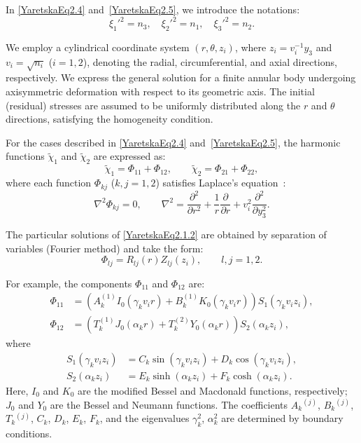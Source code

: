In \eqref{YaretskaEq2.4} and~\eqref{YaretskaEq2.5}, we introduce the notations:
\begin{equation} \label{YaretskaEq2.1.1}
	\xi_1'^2 = n_3, \quad \xi_2'^2 = n_1, \quad \xi_3'^2 = n_2.
\end{equation}

We employ a cylindrical coordinate system $(r, \theta, z_i)$, where $z_i = v_i^{-1} y_3$ and $v_i = \sqrt{n_i}$ ($i=1,2$), denoting the radial, circumferential, and axial directions, respectively. We express the general solution for a finite annular body undergoing axisymmetric deformation with respect to its geometric axis. The initial (residual) stresses are assumed to be uniformly distributed along the $r$ and $\theta$ directions, satisfying the homogeneity condition.

For the cases described in \eqref{YaretskaEq2.4} and~\eqref{YaretskaEq2.5}, the harmonic functions $\tilde{\chi}_1$ and $\tilde{\chi}_2$ are expressed as:
\begin{equation} \label{YaretskaEq2.1.2}
	\tilde{\chi}_1 = \Phi_{11} + \Phi_{12}, \qquad \tilde{\chi}_2 = \Phi_{21} + \Phi_{22},
\end{equation}
where each function $\Phi_{kj}$ ($k,j=1,2$) satisfies Laplace’s equation~\cite{YaretskaRef17}:
\begin{equation} \label{YaretskaEq2.1.3}
	\nabla^2 \Phi_{kj} = 0, \qquad \nabla^2 = \frac{\partial^2}{\partial r^2} + \frac{1}{r} \frac{\partial}{\partial r} + v_i^2 \frac{\partial^2}{\partial y_3^2}.
\end{equation}

The particular solutions of \eqref{YaretskaEq2.1.2} are obtained by separation of variables (Fourier method) and take the form:
\begin{equation} \label{YaretskaEq2.1.4}
	\Phi_{lj} = R_{lj}(r) Z_{lj}(z_i), \qquad l,j = 1,2.
\end{equation}

For example, the components $\Phi_{11}$ and $\Phi_{12}$ are:
\begin{equation} \label{YaretskaEq2.1.5}
	\begin{array}{ll}
		\Phi_{11} &= \left( A_k^{(1)} I_0(\gamma_k v_i r) + B_k^{(1)} K_0(\gamma_k v_i r) \right) S_1(\gamma_k v_i z_i),  \\
	\Phi_{12} &= \left( T_k^{(1)} J_0(\alpha_k r) + T_k^{(2)} Y_0(\alpha_k r) \right) S_2(\alpha_k z_i), 
	\end{array}
\end{equation}
where
\begin{align*}
	S_1(\gamma_k v_i z_i) &= C_k \sin(\gamma_k v_i z_i) + D_k \cos(\gamma_k v_i z_i), \\
	S_2(\alpha_k z_i) &= E_k \sinh(\alpha_k z_i) + F_k \cosh(\alpha_k z_i).
\end{align*}
Here, $I_0$ and $K_0$ are the modified Bessel and Macdonald functions, respectively; $J_0$ and $Y_0$ are the Bessel and Neumann functions. The coefficients $A_k{}^{(j)}$, $B_k{}^{(j)}$, $T_k{}^{(j)}$, $C_k$, $D_k$, $E_k$, $F_k$, and the eigenvalues $\gamma_k^2$, $\alpha_k^2$ are determined by boundary conditions.

